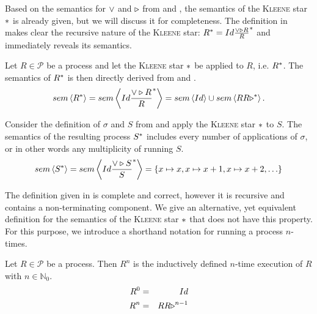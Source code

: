 Based on the semantics for $\vee$ and $\triangleright$ from  and , the semantics of the \textsc{Kleene} star $*$ is already given, but we will discuss it for completeness. The definition in  makes clear the recursive nature of the \textsc{Kleene} star: $R^* = Id \frac{\vee \triangleright R}{R}^*$ and immediately reveals its semantics.
\begin{definition}
\label{def:sem_kleene}
Let $R \in \mathcal{P}$ be a process and let the \textsc{Kleene} star $*$ be applied to $R$, i.e. $R^*$. The semantics of $R^*$ is then directly derived from  and .
  \begin{equation}
    \label{eqn:sem_kleene}
    sem \left\langle R^* \right\rangle = sem \left\langle Id \frac{\vee \triangleright R}{R}^* \right\rangle = sem \left\langle Id \right\rangle \cup sem \left\langle R R \triangleright ^* \right\rangle.
  \end{equation}
  \hfill\qedsymbol
\end{definition}

\begin{example}
Consider the definition of $\sigma$ and $S$ from  and apply the \textsc{Kleene} star $*$ to $S$. The semantics of the resulting process $S^*$ includes every number of applications of $\sigma$, or in other words any multiplicity of running $S$.
  \begin{equation}
    sem \left\langle S^* \right\rangle = sem \left\langle Id \frac{\vee \triangleright S}{S}^* \right\rangle = \left\{ x \mapsto x, x \mapsto x+1, x \mapsto x+2, \ldots \right\}
  \end{equation}
  \hfill\qedsymbol
\end{example}

The definition given in  is complete and correct, however it is recursive and contains a non-terminating component. We give an alternative, yet equivalent definition for the semantics of the \textsc{Kleene} star $*$ that does not have this property. For this purpose, we introduce a shorthand notation for running a process $n$-times.
\begin{definition}
\label{def:multiple_execution}
Let $R \in \mathcal{P}$ be a process. Then $R^n$ is the inductively defined $n$-time execution of $R$ with $n \in \mathbb{N}_0$.
  \begin{eqnarray}
    \label{eqn:multiple_execution}
    R^0 & = & Id \\
    R^n & = & R R \triangleright ^{n-1} 
  \end{eqnarray}
  \hfill\qedsymbol
\end{definition}

